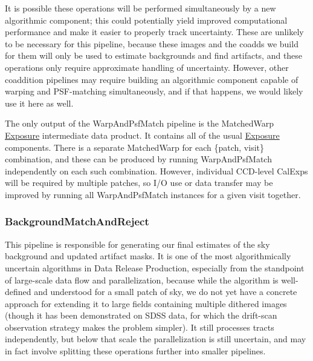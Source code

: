 It is possible these operations will be performed simultaneously by a new algorithmic component; this could potentially yield improved computational performance and make it easier to properly track uncertainty.  These are unlikely to be necessary for this pipeline, because these images and the coadds we build for them will only be used to estimate backgrounds and find artifacts, and these operations only require approximate handling of uncertainty.  However, other coaddition pipelines may require building an algorithmic component capable of warping and PSF-matching simultaneously, and if that happens, we would likely use it here as well.

The only output of the WarpAndPsfMatch pipeline is the MatchedWarp \hyperref[sec:spImagesExposure]{Exposure} intermediate data product.  It contains all of the usual \hyperref[sec:spImagesExposure]{Exposure} components.  There is a separate MatchedWarp for each \{patch, visit\} combination, and these can be produced by running WarpAndPsfMatch independently on each such combination.  However, individual CCD-level CalExps will be required by multiple patches, so I/O use or data transfer may be improved by running all WarpAndPsfMatch instances for a given visit together.

\subsubsection{BackgroundMatchAndReject}
\label{sec:drpBackgroundMatchAndReject}

This pipeline is responsible for generating our final estimates of the sky background and updated artifact masks.  It is one of the most algorithmically uncertain algorithms in Data Release Production, especially from the standpoint of large-scale data flow and parallelization, because while the algorithm is well-defined and understood for a small patch of sky, we do not yet have a concrete approach for extending it to large fields containing multiple dithered images (though it has been demonstrated on SDSS data, for which the drift-scan observation strategy makes the problem simpler).  It still processes tracts independently, but below that scale the parallelization is still uncertain, and may in fact involve splitting these operations further into smaller pipelines.

